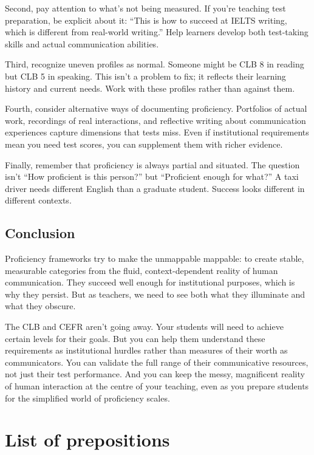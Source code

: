 Second, pay attention to what's not being measured. If you're teaching test preparation, be explicit about it: \enquote{This is how to succeed at IELTS writing, which is different from real-world writing.} Help learners develop both test-taking skills and actual communication abilities.

Third, recognize uneven profiles as normal. Someone might be CLB 8 in reading but CLB 5 in speaking. This isn't a problem to fix; it reflects their learning history and current needs. Work with these profiles rather than against them.

Fourth, consider alternative ways of documenting proficiency. Portfolios of actual work, recordings of real interactions, and reflective writing about communication experiences capture dimensions that tests miss. Even if institutional requirements mean you need test scores, you can supplement them with richer evidence.

Finally, remember that proficiency is always partial and situated. The question isn't \enquote{How proficient is this person?} but \enquote{Proficient enough for what?} A taxi driver needs different English than a graduate student. Success looks different in different contexts.

\section{Conclusion}

Proficiency frameworks try to make the unmappable mappable: to create stable, measurable categories from the fluid, context-dependent reality of human communication. They succeed well enough for institutional purposes, which is why they persist. But as teachers, we need to see both what they illuminate and what they obscure.

The CLB and CEFR aren't going away. Your students will need to achieve certain levels for their goals. But you can help them understand these requirements as institutional hurdles rather than measures of their worth as communicators. You can validate the full range of their communicative resources, not just their test performance. And you can keep the messy, magnificent reality of human interaction at the centre of your teaching, even as you prepare students for the simplified world of proficiency scales.




\chapter{List of prepositions} \label{sec:preps-list}

